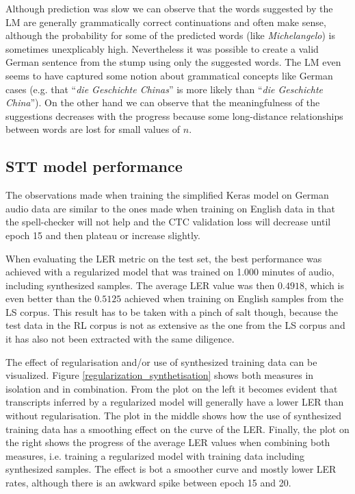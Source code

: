Although prediction was slow we can observe that the words suggested by the \ac{LM} are generally grammatically correct continuations and often make sense, although the probability for some of the predicted words (like \textit{Michelangelo}) is sometimes unexplicably high. Nevertheless it was possible to create a valid German sentence from the stump using only the suggested words. The \ac{LM} even seems to have captured some notion about grammatical concepts like German cases (e.g. that \foreignquote{french}{\textit{die Geschichte Chinas}} is more likely than \foreignquote{french}{\textit{die Geschichte China}}). On the other hand we can observe that the meaningfulness of the suggestions decreases with the progress because some long-distance relationships between words are lost for small values of $n$.

\subsection{\ac{STT} model performance}

The observations made when training the simplified Keras model on German audio data are similar to the ones made when training on English data in that the spell-checker will not help and the CTC validation loss will decrease until epoch 15 and then plateau or increase slightly.

When evaluating the \ac{LER} metric on the test set, the best performance was achieved with a regularized model that was trained on 1.000 minutes of audio, including synthesized samples. The average \ac{LER} value was then $0.4918$, which is even better than the $0.5125$ achieved when training on English samples from the \ac{LS} corpus. This result has to be taken with a pinch of salt though, because the test data in the \ac{RL} corpus is not as extensive as the one from the \ac{LS} corpus and it has also not been extracted with the same diligence. 

The effect of regularisation and/or use of synthesized training data can be visualized. Figure \ref{regularization_synthetisation} shows both measures in isolation and in combination. From the plot on the left it becomes evident that transcripts inferred by a regularized model will generally have a lower \ac{LER} than without regularisation. The plot in the middle shows how the use of synthesized training data has a smoothing effect on the curve of the \ac{LER}. Finally, the plot on the right shows the progress of the average \ac{LER} values when combining both measures, i.e. training a regularized model with training data including synthesized samples. The effect is bot a smoother curve and mostly lower \ac{LER} rates, although there is an awkward spike between epoch 15 and 20.

